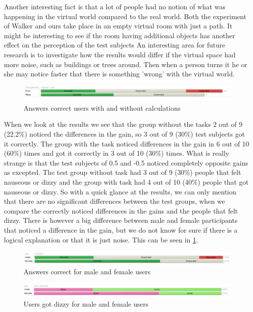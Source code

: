 Another interesting fact is that a lot of people had no notion of what was happening in the virtual world compared to the real world.
Both the experiment of Walker \cite{jwalker} and ours take place in an empty virtual room with just a path.
It might be interesting to see if the room having additional objects has another effect on the perception of the test subjects
An interesting area for future research is to investigate how the results would differ if the virtual space had more noise, such as buildings or trees around.
Then when a person turns it he or she may notice faster that there is something 'wrong'  with the virtual world.

\begin{figure}[htb]
	\centering
	\includegraphics[width=\linewidth]{sections/finalreport/images/graph3.png}	
	\caption{Answers correct users with and without calculations}
	\label{fig:grp3}
\end{figure}

When we look at the results we see that the group without the tasks 2 out of 9 (22.2\%) noticed the differences in the gain, so 3 out of 9 (30\%)  test subjects got it correctly.  
The group with the task noticed differences in the gain in 6 out of 10 (60\%) times and got it correctly in 3 out of 10 (30\%) times. 
What is really strange is that the test subjects of 0.5 and -0.5 noticed completely opposite gains as excepted. 
The test group without task had 3 out of 9 (30\%) people that felt nauseous or dizzy and the group with task had 4 out of 10 (40\%) people that got nauseous or dizzy. 
So with a quick glance at the results, we can only mention that there are no significant differences between the test groups, when we compare the correctly noticed differences in the gains and the people that felt dizzy.
 There is however a big difference between male and female participants that noticed a difference in the gain, but we do not know for sure if there is a logical explanation or that it is just noise.
 This can be seen in \ref{fig:grp3}.

\begin{figure}[htb]
	\centering
	\includegraphics[width=\linewidth]{sections/finalreport/images/graph5.png}	
	\caption{Answers correct for male and female users}
	\label{fig:grp4}
\end{figure}
\begin{figure}[htb]
	\centering
	\includegraphics[width=\linewidth]{sections/finalreport/images/graph4.png}	
	\caption{Users got dizzy for male and female users}
	\label{fig:grp5}
\end{figure}

